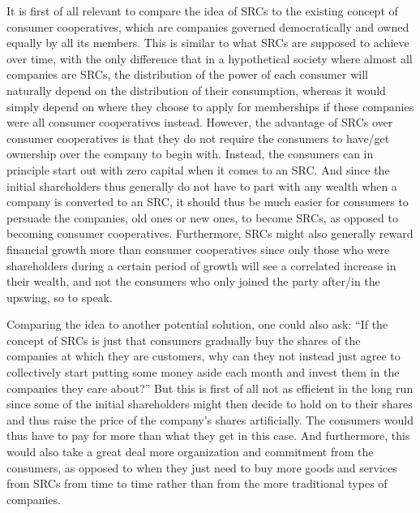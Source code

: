 \documentclass{article}
\begin{document}
It is first of all relevant to compare the idea of SRCs to the existing concept of consumer cooperatives, which are companies governed democratically and owned equally by all its members. This is similar to what SRCs are supposed to achieve over time, with the only difference that in a hypothetical society where almost all companies are SRCs, the distribution of the power of each consumer will naturally depend on the distribution of their consumption, whereas it would simply depend on where they choose to apply for memberships if these companies were all consumer cooperatives instead.
However, the advantage of SRCs over consumer cooperatives is that they do not require the consumers to have/get ownership over the company to begin with. 
Instead, the consumers can in principle start out with zero capital when it comes to an SRC. %
And since the initial shareholders thus generally do not have to part with any wealth when a company is converted to an SRC, it should thus be much easier for consumers to persuade the companies, old ones or new ones, to become SRCs, as opposed to becoming consumer cooperatives. Furthermore, SRCs might also generally reward financial growth more than consumer cooperatives since only those who were shareholders during a certain period of growth will see a correlated increase in their wealth, and not the consumers who only joined the party after/in the upswing, so to speak. 


Comparing the idea to another potential solution, one could also ask: ``If the concept of SRCs is just that consumers gradually buy the shares of the companies at which they are customers, why can they not instead just agree to collectively start putting some money aside each month and invest them in the companies they care about?'' But this is first of all not as efficient in the long run since some of the initial shareholders might then decide to hold on to their shares and thus raise the price of the company's shares artificially. The consumers would thus have to pay for more than what they get in this case. And furthermore, this would also take a great deal more organization and commitment from the consumers, as opposed to when they just need to buy more goods and services from SRCs from time to time rather than from the more traditional types of companies. 

%
%
\end{document}
